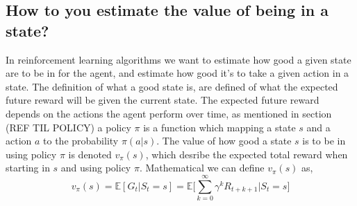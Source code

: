 \documentclass[11pt]{article}
\begin{document}
\subsection{How to you estimate the value of being in a state?}

In reinforcement learning algorithms we want to estimate how good a given state are to be in for the agent, and estimate how good it's to take a given action in a state. The definition of what a good state is, are defined of what the expected future reward will be given the current state. The expected future reward depends on the actions the agent perform over time, as mentioned in section (REF TIL POLICY) a policy $\pi$ is a function which mapping a state $s$ and a action $a$ to the probability $\pi(a|s)$.
The value of how good a state $s$ is to be in using policy $\pi$ is denoted $v_{\pi}(s)$, which desribe the expected total reward when starting in $s$ and using policy $\pi$. Mathematical we can define $v_{\pi}(s)$ as,
\begin{equation}
    v_{\pi}(s) = \mathds{E}[G_{t} | S_{t} = s] = \mathds{E}\bigg[\sum_{k = 0}^{\infty} \gamma^{k} R_{t + k + 1} \bigg| S_{t} = s \bigg]
\end{equation}


%
%
\end{document}

